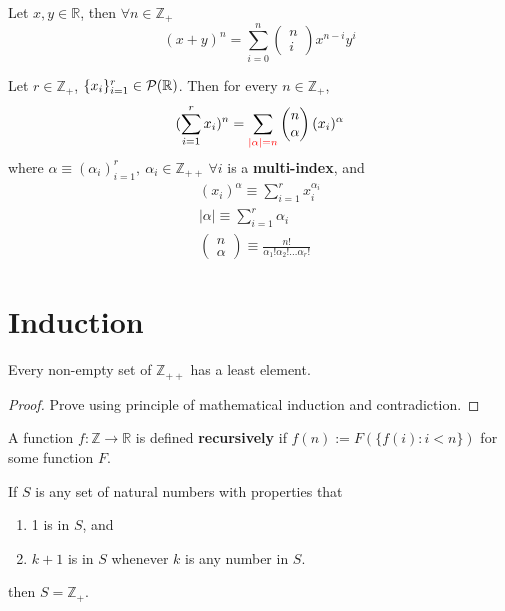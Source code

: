 \documentclass{article}
\def\Z{{\mathbb Z}}
\def\R{{\mathbb R}}
\newcommand{\bi}[2]{\begin{pmatrix}{#1}\\{#2}\end{pmatrix}}
\begin{document}
		\begin{theorem}
			Let $x, y \in \R$, then $\forall n \in \Z_+$
			\begin{equation}
				(x + y)^n = \sum_{i=0}^n \bi{n}{i} x^{n-i} y^i
			\end{equation}
		\end{theorem}
		
		\begin{theorem}
			Let $r \in \Z_+$, $\{x_i\}_{i=1}^r \in \mc{P}(\R)$. Then for every $n \in \Z_+$,
			\begin{equation}
				(\sum_{i=1}^r x_i)^n = \sum_{\red{|\alpha|=n}} \bi{n}{\alpha} (x_i)^\alpha
			\end{equation}
			where $\alpha \equiv (\alpha_i)_{i=1}^r,\ \alpha_i \in \Z_{++}\ \forall i$ is a \textbf{multi-index}, and 
			\begin{gather}
				(x_i)^\alpha \equiv \sum_{i=1}^r x_i^{\alpha_i} \\
				|\alpha| \equiv \sum_{i=1}^r \alpha_i \\
				\bi{n}{\alpha} \equiv \frac{n!}{\alpha_1!\alpha_2!\dots\alpha_r!}
			\end{gather}
		\end{theorem}
		
	\section{Induction}
		\begin{theorem}
			Every non-empty set of $\Z_{++}$ has a least element.
			\begin{proof}
				Prove using principle of mathematical induction and contradiction.
			\end{proof}
		\end{theorem}
		
		\begin{definition}
			A function $f: \Z \to \R$ is defined \textbf{recursively} if $f(n) := F(\{f(i): i < n\})$ for some function $F$.
		\end{definition}
		
		\begin{theorem}
			If $S$ is any set of natural numbers with properties that
			\begin{enumerate}
				\item 1 is in $S$, and
				\item $k+1$ is in $S$ whenever $k$ is any number in $S$.
			\end{enumerate}
			then $S = \Z_+$.
		\end{theorem}
		
\end{document}
